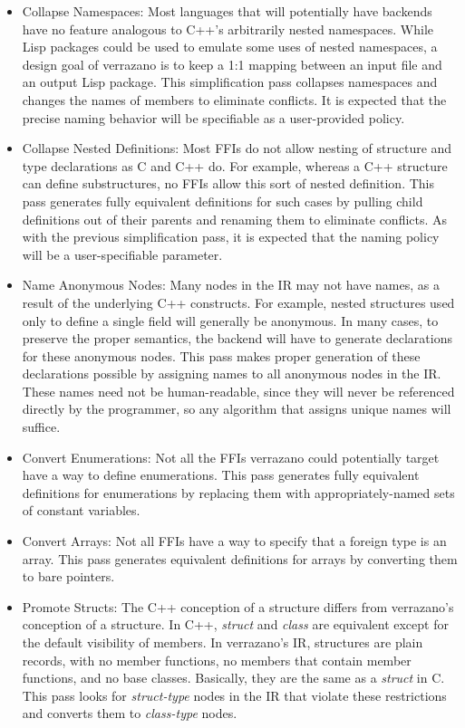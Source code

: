 \documentclass[12pt]{article}
\begin{document}
\begin{itemize}
\item Collapse Namespaces: Most languages that will potentially have backends have no feature analogous to C++'s arbitrarily nested namespaces. While Lisp packages could be used to emulate some uses of nested namespaces, a design goal of verrazano is to keep a 1:1 mapping between an input file and an output Lisp package. This simplification pass collapses namespaces and changes the names of members to eliminate conflicts. It is expected that the precise naming behavior will be specifiable as a user-provided policy. 
\item Collapse Nested Definitions: Most FFIs do not allow nesting of structure and type declarations as C and C++ do. For example, whereas a C++ structure can define substructures, no FFIs allow this sort of nested definition. This pass generates fully equivalent definitions for such cases by pulling child definitions out of their parents and renaming them to eliminate conflicts. As with the previous simplification pass, it is expected that the naming policy will be a user-specifiable parameter. 
\item Name Anonymous Nodes: Many nodes in the IR may not have names, as a result of the underlying C++ constructs. For example, nested structures used only to define a single field will generally be anonymous. In many cases, to preserve the proper semantics, the backend will have to generate declarations for these anonymous nodes. This pass makes proper generation of these declarations possible by assigning names to all anonymous nodes in the IR. These names need not be human-readable, since they will never be referenced directly by the programmer, so any algorithm that assigns unique names will suffice. 
\item Convert Enumerations: Not all the FFIs verrazano could potentially target have a way to define enumerations. This pass generates fully equivalent definitions for enumerations by replacing them with appropriately-named sets of constant variables. 
\item Convert Arrays: Not all FFIs have a way to specify that a foreign type is an array. This pass generates equivalent definitions for arrays by converting them to bare pointers.
\item Promote Structs: The C++ conception of a structure differs from verrazano's conception of a structure. In C++, \emph{struct} and \emph{class} are equivalent except for the default visibility of members. In verrazano's IR, structures are plain records, with no member functions, no members that contain member functions, and no base classes. Basically, they are the same as a \emph{struct} in C. This pass looks for \emph{struct-type} nodes in the IR that violate these restrictions and converts them to \emph{class-type} nodes.

\end{itemize}
\end{document}
